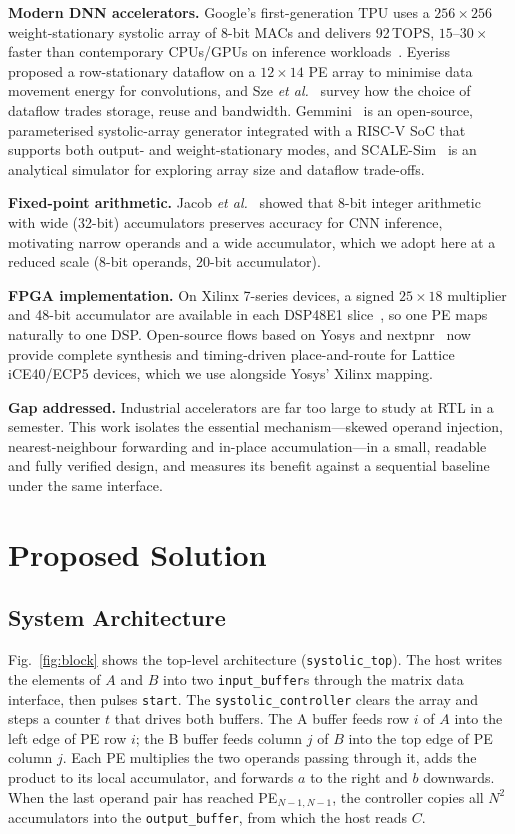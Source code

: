 \documentclass[conference]{IEEEtran}
\begin{document}
\textbf{Modern DNN accelerators.} Google's first-generation TPU uses a
$256\times256$ weight-stationary systolic array of 8-bit MACs and delivers
92\,TOPS, $15$--$30\times$ faster than contemporary CPUs/GPUs on inference
workloads~\cite{jouppi2017tpu}. Eyeriss~\cite{chen2017eyeriss} proposed a
row-stationary dataflow on a $12\times14$ PE array to minimise data movement
energy for convolutions, and Sze \emph{et al.}~\cite{sze2017efficient} survey
how the choice of dataflow trades storage, reuse and bandwidth. Gemmini~\cite{genc2021gemmini}
is an open-source, parameterised systolic-array generator integrated with a
RISC-V SoC that supports both output- and weight-stationary modes, and
SCALE-Sim~\cite{samajdar2018scale} is an analytical simulator for exploring
array size and dataflow trade-offs.

\textbf{Fixed-point arithmetic.} Jacob \emph{et al.}~\cite{jacob2018quantization}
showed that 8-bit integer arithmetic with wide (32-bit) accumulators preserves
accuracy for CNN inference, motivating narrow operands and a wide
accumulator, which we adopt here at a reduced scale (8-bit operands, 20-bit
accumulator).

\textbf{FPGA implementation.} On Xilinx 7-series devices, a signed
$25\times18$ multiplier and 48-bit accumulator are available in each DSP48E1
slice~\cite{ug479}, so one PE maps naturally to one DSP. Open-source flows
based on Yosys and nextpnr~\cite{shah2019yosys} now provide complete
synthesis and timing-driven place-and-route for Lattice iCE40/ECP5 devices,
which we use alongside Yosys' Xilinx mapping.

\textbf{Gap addressed.} Industrial accelerators are far too large to study at
RTL in a semester. This work isolates the essential mechanism---skewed operand
injection, nearest-neighbour forwarding and in-place accumulation---in a small,
readable and fully verified design, and measures its benefit against a
sequential baseline under the same interface.

\section{Proposed Solution}

\subsection{System Architecture}
Fig.~\ref{fig:block} shows the top-level architecture
(\texttt{systolic\_top}). The host writes the elements of $A$ and $B$ into two
\texttt{input\_buffer}s through the matrix data interface, then pulses
\texttt{start}. The \texttt{systolic\_controller} clears the array and steps a
counter $t$ that drives both buffers. The A buffer feeds row $i$ of $A$ into the
left edge of PE row $i$; the B buffer feeds column $j$ of $B$ into the top edge
of PE column $j$. Each PE multiplies the two operands passing through it, adds
the product to its local accumulator, and forwards $a$ to the right and $b$
downwards. When the last operand pair has reached PE$_{N-1,N-1}$, the
controller copies all $N^2$ accumulators into the \texttt{output\_buffer}, from
which the host reads $C$.
\end{document}
